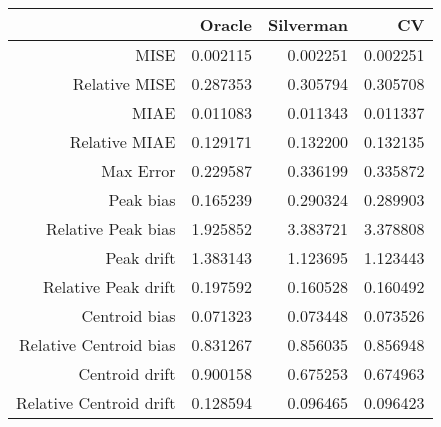 \begin{tabular}{rrrr}
  \hline
 & Oracle & Silverman & CV \\ 
  \hline
MISE & 0.002115 & 0.002251 & 0.002251 \\ 
  Relative MISE & 0.287353 & 0.305794 & 0.305708 \\ 
  MIAE & 0.011083 & 0.011343 & 0.011337 \\ 
  Relative MIAE & 0.129171 & 0.132200 & 0.132135 \\ 
  Max Error & 0.229587 & 0.336199 & 0.335872 \\ 
  Peak bias & 0.165239 & 0.290324 & 0.289903 \\ 
  Relative Peak bias & 1.925852 & 3.383721 & 3.378808 \\ 
  Peak drift & 1.383143 & 1.123695 & 1.123443 \\ 
  Relative Peak drift & 0.197592 & 0.160528 & 0.160492 \\ 
  Centroid bias & 0.071323 & 0.073448 & 0.073526 \\ 
  Relative Centroid bias & 0.831267 & 0.856035 & 0.856948 \\ 
  Centroid drift & 0.900158 & 0.675253 & 0.674963 \\ 
  Relative Centroid drift & 0.128594 & 0.096465 & 0.096423 \\ 
   \hline
\end{tabular}
